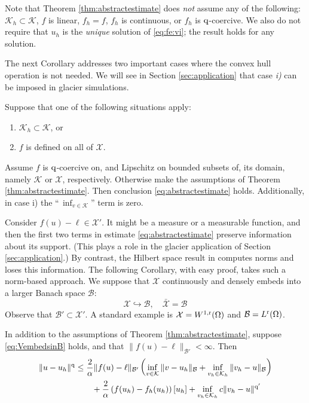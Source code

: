 \documentclass[hidelinks,onefignum,onetabnum,final]{siamart220329}  %
\newcommand{\cB}{\mathcal{B}}
\newcommand{\cK}{\mathcal{K}}
\newcommand{\cX}{\mathcal{X}}
\newcommand{\qq}{{\text{\textnormal{q}}}}
\newcommand{\rr}{{\text{\textnormal{r}}}}
\begin{document}
Note that Theorem \ref{thm:abstractestimate} does \emph{not} assume any of the following: $\cK_h \subset \cK$, $f$ is linear, $f_h=f$, $f_h$ is continuous, or $f_h$ is $\qq$-coercive.  We also do not require that $u_h$ is the \emph{unique} solution of \eqref{eq:fe:vi}; the result holds for any solution.

The next Corollary addresses two important cases where the convex hull operation is not needed.  We will see in Section \ref{sec:application} that case \emph{i)} can be imposed in glacier simulations.

\begin{corollary}  \label{cor:abstractestimate:nohull}  Suppose that one of the following situations apply:
\renewcommand{\labelenumi}{\roman{enumi})}
\begin{enumerate}
\item $\cK_h \subset \cK$, or
\item $f$ is defined on all of $\cX$.
\end{enumerate}
Assume $f$ is $\qq$-coercive on, and Lipschitz on bounded subsets of, its domain, namely $\cK$ or $\cX$, respectively.  Otherwise make the assumptions of Theorem \ref{thm:abstractestimate}.  Then conclusion \eqref{eq:abstractestimate} holds.  Additionally, in case i) the ``\,$\inf_{v\in\cK}$'' term is zero.
\end{corollary}

Consider $f(u)-\ell\in \cX'$.  It might be a measure or a measurable function, and then the first two terms in estimate \eqref{eq:abstractestimate} preserve information about its support.  (This plays a role in the glacier application of Section \ref{sec:application}.)  By contrast, the Hilbert space result in \cite{Falk1974} computes norms and loses this information.  The following Corollary, with easy proof, takes such a norm-based approach.  We suppose that $\cX$ continuously and densely embeds into a larger Banach space $\cB$:
\begin{equation}
\cX \hookrightarrow \cB, \quad \bar{\cX} = \cB \label{eq:VembedsinB}
\end{equation}
Observe that $\cB' \subset \cX'$.  A standard example is $\cX=W^{1,\rr}(\Omega)$ and $\cB=L^\rr(\Omega)$.

\begin{corollary}  \label{cor:abstractestimate:Bnorm}  In addition to the assumptions of Theorem \ref{thm:abstractestimate}, suppose \eqref{eq:VembedsinB} holds, and that $\|f(u)-\ell\|_{\cB'} < \infty$.  Then
\begin{align}
\|u-u_h\|^\qq &\le \frac{2}{\alpha} \|f(u)-\ell\|_{\cB'} \left( \inf_{v\in\cK} \|v-u_h\|_{\cB} +   \inf_{v_h\in\cK_h} \|v_h-u\|_{\cB} \right) \label{eq:abstractestimate:Bnorm} \\
   &\qquad + \frac{2}{\alpha} \left(f(u_h)-f_h(u_h)\right)[u_h] + \inf_{v_h\in\cK_h} c \|v_h - u\|^{\qq'} \notag
\end{align}
\end{corollary}
\end{document}
